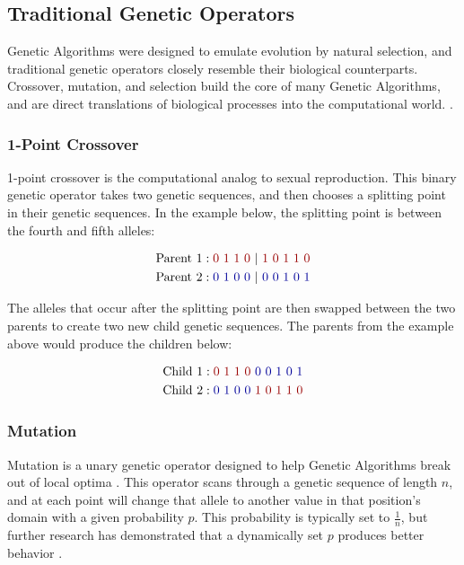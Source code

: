 \subsection*{Traditional Genetic Operators}
Genetic Algorithms were designed to emulate evolution by natural selection, and traditional genetic operators closely resemble their biological counterparts. Crossover, mutation, and selection build the core of many Genetic Algorithms, and are direct translations of biological processes into the computational world. \cite{Russell10}.

\subsubsection*{1-Point Crossover}
1-point crossover is the computational analog to sexual reproduction. This binary genetic operator takes two genetic sequences, and then chooses a splitting point in their genetic sequences. In the example below, the splitting point is between the fourth and fifth alleles:

\begin{align*}
\text{Parent 1} &: {\color{myred}0~1~1~0~}|{\color{myred}~1~0~1~1~0} 			\\
\text{Parent 2} &: {\color{myblue}0~1~0~0~}|{\color{myblue}~0~0~1~0~1} 	\\		
\end{align*}

\noindent The alleles that occur after the splitting point are then swapped between the two parents to create two new child genetic sequences. The parents from the example above would produce the children below:

\begin{align*}
\text{Child 1} &: {\color{myred}0~1~1~0}{\color{myblue}~0~0~1~0~1} 			\\  
\text{Child 2} &: {\color{myblue}0~1~0~0}{\color{myred}~1~0~1~1~0} 		
\end{align*}

\subsubsection*{Mutation}
Mutation is a unary genetic operator designed to help Genetic Algorithms break out of local optima \cite{Russell10}. This operator scans through a genetic sequence of length $n$, and at each point will change that allele to another value in that position's domain with a given probability $p$. This probability is typically set to $\frac{1}{n}$, but further research has demonstrated that a dynamically set $p$ produces better behavior \cite{Back93}.

